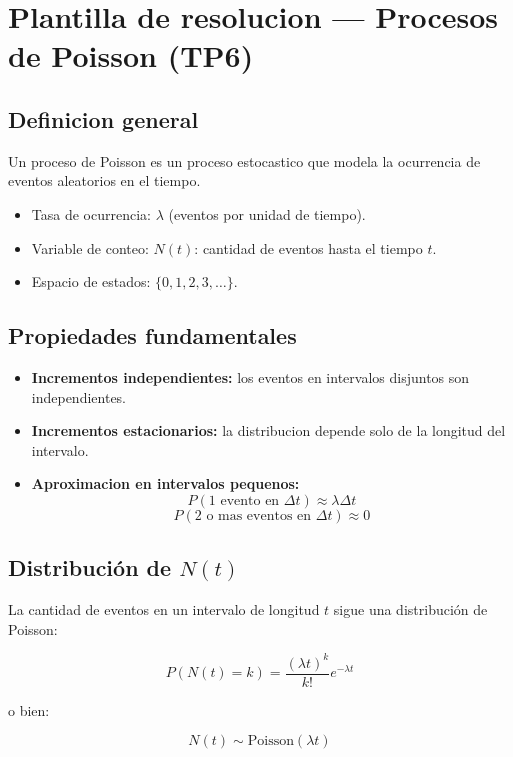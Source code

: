 \documentclass{article}
\begin{document}
\section{Plantilla de resolucion --- Procesos de Poisson (TP6)}

\subsection{Definicion general}

Un proceso de Poisson es un proceso estocastico que modela la ocurrencia de eventos aleatorios en el tiempo.

\begin{itemize}
  \item Tasa de ocurrencia: $\lambda$ (eventos por unidad de tiempo).
  \item Variable de conteo: $N(t)$: cantidad de eventos hasta el tiempo $t$.
  \item Espacio de estados: $\{0, 1, 2, 3, \dots\}$.
\end{itemize}

\subsection*{Propiedades fundamentales}

\begin{itemize}
  \item \textbf{Incrementos independientes:} los eventos en intervalos disjuntos son independientes.
  \item \textbf{Incrementos estacionarios:} la distribucion depende solo de la longitud del intervalo.
  \item \textbf{Aproximacion en intervalos pequenos:}
  \[
  P(\text{1 evento en } \Delta t) \approx \lambda \Delta t
  \]
  \[
  P(\text{2 o mas eventos en } \Delta t) \approx 0
  \]
\end{itemize}

\subsection*{Distribuci\'on de $N(t)$}

La cantidad de eventos en un intervalo de longitud $t$ sigue una distribuci\'on de Poisson:

\[
P(N(t) = k) = \frac{(\lambda t)^k}{k!} e^{-\lambda t}
\]

o bien:

\[
N(t) \sim \text{Poisson}(\lambda t)
\]
\end{document}
